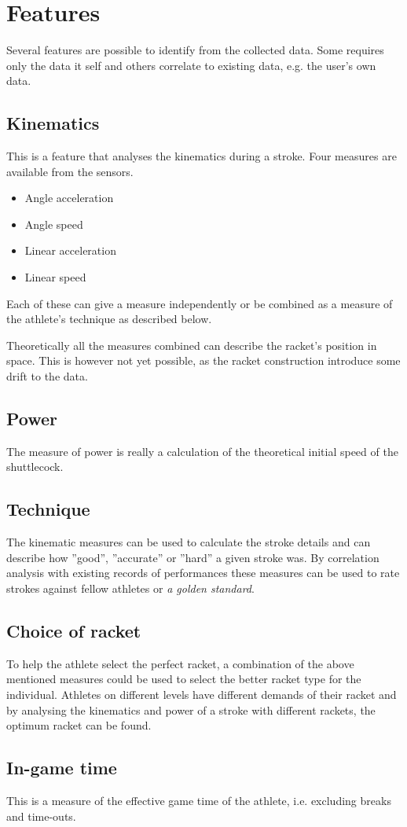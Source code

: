 
\section{Features}
Several features are possible to identify from the collected data.
Some requires only the data it self and others correlate to existing data, e.g. the user's own data.

\subsection*{Kinematics}
This is a feature that analyses the kinematics during a stroke.
Four measures are available from the sensors.

\begin{itemize}
    \item Angle acceleration
    \item Angle speed
    \item Linear acceleration
    \item Linear speed
\end{itemize}

Each of these can give a measure independently or be combined as a measure of the athlete's technique as described below.

Theoretically all the measures combined can describe the racket's position in space.
This is however not yet possible, as the racket construction introduce some drift to the data.

\subsection*{Power}
The measure of power is really a calculation of the theoretical initial speed of the shuttlecock.

\subsection*{Technique}
The kinematic measures can be used to calculate the stroke details and can describe how ''good'', ''accurate'' or ''hard'' a given stroke was.
By correlation analysis with existing records of performances these measures can be used to rate strokes against fellow athletes or \textit{a golden standard}.

\subsection*{Choice of racket}
To help the athlete select the perfect racket, a combination of the above mentioned measures could be used to select the better racket type for the individual.
Athletes on different levels have different demands of their racket and by analysing the kinematics and power of a stroke with different rackets, the optimum racket can be found.

\subsection*{In-game time}
This is a measure of the effective game time of the athlete, i.e. excluding breaks and time-outs.
